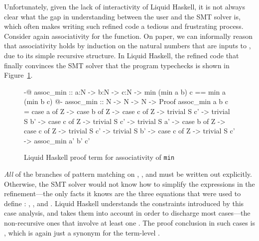 Unfortunately, given the lack of interactivity of Liquid Haskell, it
is not always clear what the gap in understanding between the user and
the SMT solver is, which often makes writing such refined code a
tedious and frustrating process. Consider again associativity for the
 function. On paper, we can informally reason that
associativity holds by induction on the natural numbers that are inputs
to , due to its simple recursive structure. In Liquid Haskell,
the refined code that finally convinces the SMT solver that the
program typechecks is shown in Figure~\ref{fig:assoc-min-proof}.


\begin{figure}
\begin{code}
  {-@ assoc_min :: a:N -> b:N -> c:N ->
        {min (min a b) c == min a (min b c)} @-}
  assoc_min :: N -> N -> N -> Proof
  assoc_min a b c =
    case a of 
      Z ->
        case b of 
          Z ->
            case c of
              Z -> trivial
              S c' -> trivial
          S b' ->
            case c of
              Z -> trivial
              S c' -> trivial
    S a' ->
      case b of 
        Z ->
          case c of
            Z -> trivial
            S c' -> trivial
        S b' ->
          case c of
            Z -> trivial
            S c' -> assoc_min a' b' c'
\end{code}
\caption{Liquid Haskell proof term for associativity of \texttt{min}}
\label{fig:assoc-min-proof}
\end{figure}

{\em All} of the branches of pattern matching on , , and 
must be written out explicitly. Otherwise, the SMT solver would not
know how to simplify the  expressions in the refinement---the
only facts it knows are the three equations that were used to define
: , , and
%
.
%
Liquid Haskell understands the constraints introduced by this case analysis,
and takes them into account in order to discharge most cases---the non-recursive
ones that involve at least one . The proof conclusion in such cases is ,
which is again just a synonym for the term-level \LC{()}.

